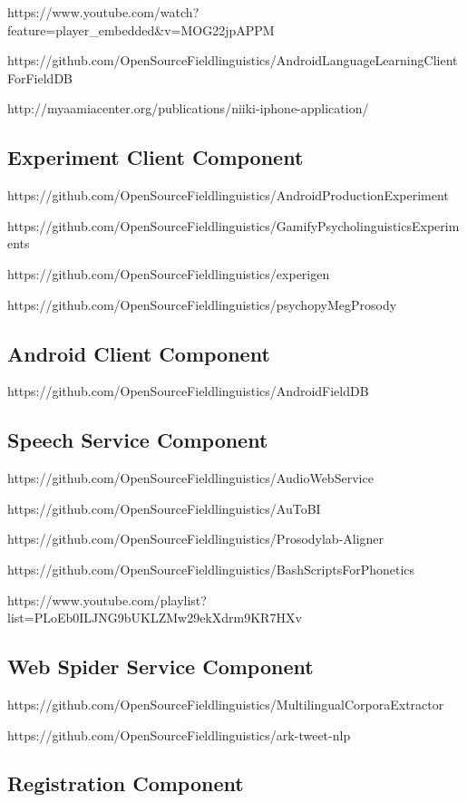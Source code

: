 \documentclass[12pt]{article}
\begin{document}
https://www.youtube.com/watch?feature=player\_embedded\&v=MOG22jpAPPM

https://github.com/OpenSourceFieldlinguistics/AndroidLanguageLearningClientForFieldDB

http://myaamiacenter.org/publications/niiki-iphone-application/

\subsection{Experiment Client Component}

https://github.com/OpenSourceFieldlinguistics/AndroidProductionExperiment

https://github.com/OpenSourceFieldlinguistics/GamifyPsycholinguisticsExperiments

https://github.com/OpenSourceFieldlinguistics/experigen


https://github.com/OpenSourceFieldlinguistics/psychopyMegProsody


\subsection{Android Client Component}

https://github.com/OpenSourceFieldlinguistics/AndroidFieldDB


\subsection{Speech Service Component}

https://github.com/OpenSourceFieldlinguistics/AudioWebService

https://github.com/OpenSourceFieldlinguistics/AuToBI

https://github.com/OpenSourceFieldlinguistics/Prosodylab-Aligner

https://github.com/OpenSourceFieldlinguistics/BashScriptsForPhonetics


https://www.youtube.com/playlist?list=PLoEb0ILJNG9bUKLZMw29ekXdrm9KR7HXv

\subsection{Web Spider Service Component}

https://github.com/OpenSourceFieldlinguistics/MultilingualCorporaExtractor


https://github.com/OpenSourceFieldlinguistics/ark-tweet-nlp


\subsection{Registration Component}
\end{document}
